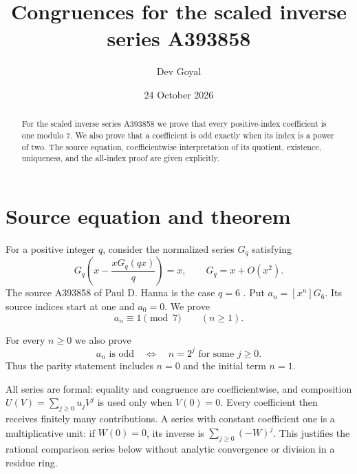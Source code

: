 \documentclass[11pt,a4paper]{article}
\title{Congruences for the scaled inverse series A393858}
\author{Dev Goyal}
\date{24 October 2026}
\theoremstyle{remark}\newtheorem{remark}[theorem]{Remark}
\begin{document}
\maketitle
\begin{center}\end{center}

\begin{abstract}
For the scaled inverse series A393858 we prove that every
positive-index coefficient is one modulo 7.
We also prove that a coefficient is odd exactly when its index is a power of two.
The source equation, coefficientwise interpretation of its quotient,
existence, uniqueness, and the all-index proof are given explicitly.
\end{abstract}
\section{Source equation and theorem}
For a positive integer $q$, consider the normalized series $G_q$ satisfying
\begin{equation}\label{eq:scaled-source}
 G_q\left(x-\frac{xG_q(qx)}q\right)=x,
 \qquad G_q=x+O(x^2).
\end{equation}
The source A393858 of Paul D. Hanna is the case $q=6$
\cite{oeis}. Put $a_n=[x^n]G_{6}$. Its source indices
start at one and $a_0=0$. We prove
\[
 a_n\equiv1\pmod{7}\qquad(n\ge1).
\]

For every $n\ge0$ we also prove
\[
 a_n\text{ is odd}\quad\Longleftrightarrow\quad
 n=2^j\text{ for some }j\ge0.
\]
Thus the parity statement includes $n=0$ and the initial term $n=1$.

All series are formal: equality and congruence are coefficientwise, and
composition $U(V)=\sum_{j\ge0}u_jV^j$ is used only when $V(0)=0$.
Every coefficient then receives finitely many contributions.
A series with constant coefficient one is a multiplicative unit:
if $W(0)=0$, its inverse is $\sum_{j\ge0}(-W)^j$.
This justifies the rational comparison series below without analytic
convergence or division in a residue ring.
\end{document}
